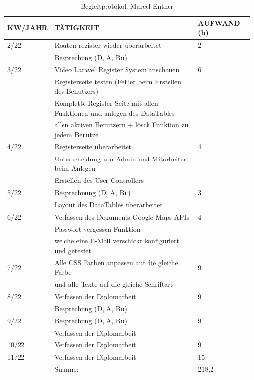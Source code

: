\begin{table}[h]
	\begin{tabular}{|l|l|l|}
		\hline
		\textbf{KW/JAHR} &     \textbf{TÄTIGKEIT}  & 	\textbf{AUFWAND (h)}    \\ \hline
		
		2/22 & Routen register wieder überarbeitet & 2 \\
			 & Besprechung (D, A, Bu)&\\ \hline
		3/22 & Video Laravel Register System anschauen & 6\\
			 & Registerseite testen (Fehler beim Erstellen des Benutzers) &\\
			 &Komplette Register Seite mit allen Funktionen und anlegen des DataTables &\\
			 &allen aktiven Benutzern + lösch Funktion zu jedem Benutze&\\ \hline
		4/22 &Registerseite überarbeitet & 4\\
			 &Unterscheidung von Admin und Mitarbeiter beim Anlegen &\\
			 &Erstellen des User Controllers&\\ \hline
		5/22 &Besprechnung (D, A, Bu)& 3\\
			 &Layout des DataTables überarbeitet& \\ \hline
		6/22 & Verfassen des Dokuments Google Maps APIs& 4\\
			 &Passwort vergessen Funktion &\\
			 &welche eine E-Mail verschickt konfiguriert und getestet&\\ \hline
		7/22 &Alle CSS Farben anpassen auf die gleiche Farbe & 9\\
			 & und alle Texte auf die gleiche Schriftart &\\ \hline
		8/22 & Verfassen der Diplomarbeit & 9\\
			 &Besprechung (D, A, Bu)& \\ \hline
		9/22 &Besprechung (D, A, Bu) & 9\\ 
			 &Verfassen der Diplomarbeit&\\ \hline
		10/22&Verfassen der Diplomarbeit& 9\\ \hline
		11/22&Verfassen der Diplomarbeit& 15\\ \hline
			 & Summe:  					& 218,2\\ \hline
			 
		
		
		
			 
		
	\end{tabular}
	\caption{Begleitprotokoll Marcel Entner}
\end{table}



